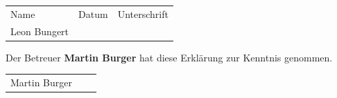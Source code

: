 \documentclass[12pt]{article}
\begin{document}
\renewcommand{\arraystretch}{4}
\begin{tabular}{l l l}
Name & Datum & Unterschrift\\
Leon Bungert & \raisebox{-3pt}{\makebox[5cm]{.\dotfill}} & \raisebox{-3pt}{\makebox[5cm]{.\dotfill}}\\
%
\end{tabular}%
%
\vspace{50pt}

\noindent
Der Betreuer \textbf{Martin Burger} hat diese Erklärung zur Kenntnis genommen.

\begin{tabular}{l l l}
	Martin Burger & \raisebox{-3pt}{\makebox[5cm]{.\dotfill}} & \raisebox{-3pt}{\makebox[5cm]{.\dotfill}}
\end{tabular}%

 
\end{document}
